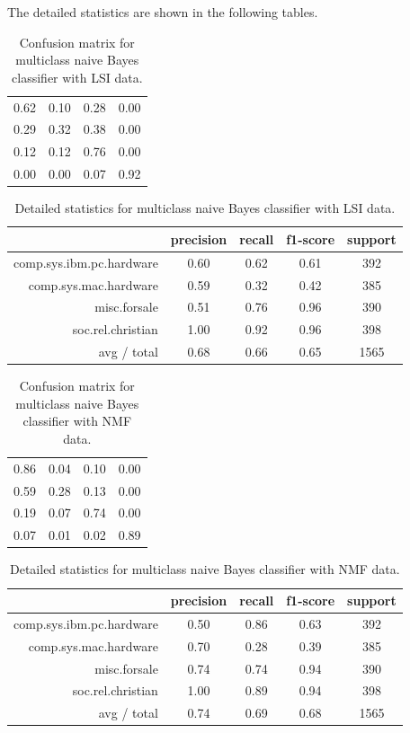 \documentclass[letterpaper]{article}
\begin{document}
The detailed statistics are shown in the following tables.
\begin{table}[H]
\centering
\begin{tabular}{cccc}
0.62 & 0.10 & 0.28 & 0.00 \\
0.29 & 0.32 & 0.38 & 0.00 \\
0.12 & 0.12 & 0.76 & 0.00 \\
0.00 & 0.00 & 0.07 & 0.92
\end{tabular}
\caption{Confusion matrix for multiclass naive Bayes classifier
with LSI data.}
\end{table}

\begin{table}[H]
\centering
\begin{tabular}{r|cccc}
& precision & recall & f1-score & support \\ \hline
comp.sys.ibm.pc.hardware & 0.60 & 0.62 & 0.61 & 392 \\
comp.sys.mac.hardware & 0.59 & 0.32 & 0.42 & 385 \\
misc.forsale & 0.51 & 0.76 & 0.96 & 390 \\
soc.rel.christian & 1.00 & 0.92 & 0.96 & 398 \\
avg / total & 0.68 & 0.66 & 0.65 & 1565 \\
\end{tabular}
\caption{Detailed statistics for multiclass naive Bayes classifier
with LSI data.}
\end{table}

\begin{table}[H]
\centering
\begin{tabular}{cccc}
0.86 & 0.04 & 0.10 & 0.00 \\
0.59 & 0.28 & 0.13 & 0.00 \\
0.19 & 0.07 & 0.74 & 0.00 \\
0.07 & 0.01 & 0.02 & 0.89
\end{tabular}
\caption{Confusion matrix for multiclass naive Bayes classifier
with NMF data.}
\end{table}

\begin{table}[H]
\centering
\begin{tabular}{r|cccc}
& precision & recall & f1-score & support \\ \hline
comp.sys.ibm.pc.hardware & 0.50 & 0.86 & 0.63 & 392 \\
comp.sys.mac.hardware & 0.70 & 0.28 & 0.39 & 385 \\
misc.forsale & 0.74 & 0.74 & 0.94 & 390 \\
soc.rel.christian & 1.00 & 0.89 & 0.94 & 398 \\
avg / total & 0.74 & 0.69 & 0.68 & 1565 \\
\end{tabular}
\caption{Detailed statistics for multiclass naive Bayes classifier
with NMF data.}
\end{table}
\end{document}
